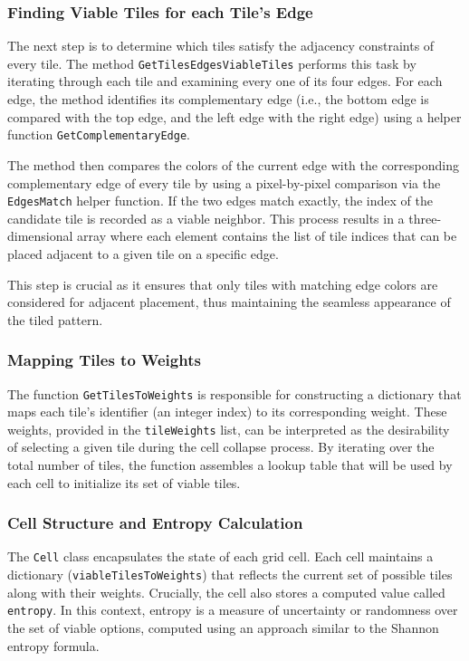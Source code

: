 \documentclass[a4paper, 12pt, one column, aas_macros]{article}
\begin{document}
\subsubsection{Finding Viable Tiles for each Tile's Edge}
The next step is to determine which tiles satisfy the adjacency constraints of every tile. The method \texttt{GetTilesEdgesViableTiles} performs this task by iterating through each tile and examining every one of its four edges. For each edge, the method identifies its complementary edge (i.e., the bottom edge is compared with the top edge, and the left edge with the right edge) using a helper function \texttt{GetComplementaryEdge}.

The method then compares the colors of the current edge with the corresponding complementary edge of every tile by using a pixel-by-pixel comparison via the \texttt{EdgesMatch} helper function. If the two edges match exactly, the index of the candidate tile is recorded as a viable neighbor. This process results in a three-dimensional array where each element contains the list of tile indices that can be placed adjacent to a given tile on a specific edge.

This step is crucial as it ensures that only tiles with matching edge colors are considered for adjacent placement, thus maintaining the seamless appearance of the tiled pattern.

\subsubsection{Mapping Tiles to Weights}
The function \texttt{GetTilesToWeights} is responsible for constructing a dictionary that maps each tile’s identifier (an integer index) to its corresponding weight. These weights, provided in the \texttt{tileWeights} list, can be interpreted as the desirability of selecting a given tile during the cell collapse process. By iterating over the total number of tiles, the function assembles a lookup table that will be used by each cell to initialize its set of viable tiles.

\subsubsection{Cell Structure and Entropy Calculation}
The \texttt{Cell} class encapsulates the state of each grid cell. Each cell maintains a dictionary (\texttt{viableTilesToWeights}) that reflects the current set of possible tiles along with their weights. Crucially, the cell also stores a computed value called \texttt{entropy}. In this context, entropy is a measure of uncertainty or randomness over the set of viable options, computed using an approach similar to the Shannon entropy formula.
\end{document}

